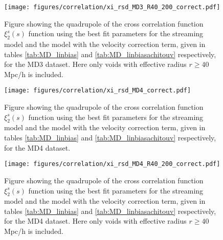 \begin{figure}[H]
    \texttt{[image: figures/correlation/xi\_rsd\_MD3\_R40\_200\_correct.pdf]}
    \caption{Figure showing the quadrupole of the cross correlation function $\xi_2^s(s)$ function using the best fit parameters for the streaming model and the model with the velocity correction term, given in tables \ref{tab:MD_linbias} and \ref{tab:MD_linbiasachitouv} respectively, for the MD3 dataset. Here only voids with effective radius $r\geq 40$Mpc/h is included.}
    \label{fig:xiMD3R40}
\end{figure}

\begin{figure}[H]
    \texttt{[image: figures/correlation/xi\_rsd\_MD4\_correct.pdf]}
    \caption{Figure showing the quadrupole of the cross correlation function $\xi_2^s(s)$ function using the best fit parameters for the streaming model and the model with the velocity correction term, given in tables \ref{tab:MD_linbias} and \ref{tab:MD_linbiasachitouv} respectively, for the MD4 dataset.}
    \label{fig:xiMD4}
\end{figure}

\begin{figure}[H]
    \texttt{[image: figures/correlation/xi\_rsd\_MD4\_R40\_200\_correct.pdf]}
    \caption{Figure showing the quadrupole of the cross correlation function $\xi_2^s(s)$ function using the best fit parameters for the streaming model and the model with the velocity correction term, given in tables \ref{tab:MD_linbias} and \ref{tab:MD_linbiasachitouv} respectively, for the MD4 dataset. Here only voids with effective radius $r\geq 40$Mpc/h is included.}
    \label{fig:xiMD4R40}
\end{figure}

